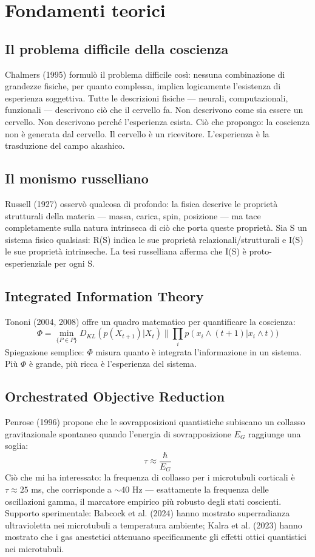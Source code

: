 \documentclass[11pt,a4paper]{article}
\begin{document}
\section{Fondamenti teorici}
\subsection{Il problema difficile della coscienza}
Chalmers (1995) formulò il problema difficile così: nessuna combinazione di grandezze fisiche, per quanto complessa, implica logicamente l'esistenza di esperienza soggettiva. Tutte le descrizioni fisiche --- neurali, computazionali, funzionali --- descrivono ciò che il cervello fa. Non descrivono come sia essere un cervello. Non descrivono perché l'esperienza esista. Ciò che propongo: la coscienza non è generata dal cervello. Il cervello è un ricevitore. L'esperienza è la trasduzione del campo akashico.

\subsection{Il monismo russelliano}
Russell (1927) osservò qualcosa di profondo: la fisica descrive le proprietà strutturali della materia --- massa, carica, spin, posizione --- ma tace completamente sulla natura intrinseca di ciò che porta queste proprietà. Sia S un sistema fisico qualsiasi: R(S) indica le sue proprietà relazionali/strutturali e I(S) le sue proprietà intrinseche. La tesi russelliana afferma che I(S) è proto-esperienziale per ogni S.

\subsection{Integrated Information Theory}
Tononi (2004, 2008) offre un quadro matematico per quantificare la coscienza:
\begin{equation}
\Phi = \min_{\{P \in P\}} D_{KL}(p(X_{t+1})|X_{t}) \parallel \prod_{i} p(x_{i} \land (t+1)|x_{i} \land t))
\end{equation}
Spiegazione semplice: $\Phi$ misura quanto è integrata l'informazione in un sistema. Più $\Phi$ è grande, più ricca è l'esperienza del sistema.

\subsection{Orchestrated Objective Reduction}
Penrose (1996) propone che le sovrapposizioni quantistiche subiscano un collasso gravitazionale spontaneo quando l'energia di sovrapposizione $E_G$ raggiunge una soglia:
\begin{equation}
\tau \approx \frac{\hbar}{E_G}
\end{equation}
Ciò che mi ha interessato: la frequenza di collasso per i microtubuli corticali è $\tau \approx 25$ ms, che corrisponde a $\sim 40$ Hz --- esattamente la frequenza delle oscillazioni gamma, il marcatore empirico più robusto degli stati coscienti. Supporto sperimentale: Babcock et al. (2024) hanno mostrato superradianza ultravioletta nei microtubuli a temperatura ambiente; Kalra et al. (2023) hanno mostrato che i gas anestetici attenuano specificamente gli effetti ottici quantistici nei microtubuli.
\end{document}
